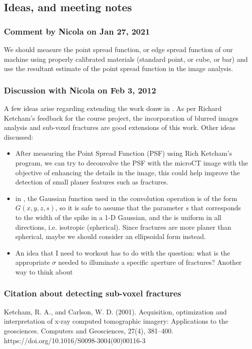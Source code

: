 \documentclass{article}
\begin{document}
\subsection{Ideas, and meeting notes}
\subsubsection{Comment by Nicola on Jan 27, 2021}
We should measure the point spread function, or edge spread function of our machine using properly calibrated materials (standard point, or cube, or bar) and use the resultant estimate of the point spread function in the image analysis. 

\subsubsection{Discussion with Nicola on Feb 3, 2012}
A few ideas arise regarding extending the work donw in \cite{Voorn2013}. As per Richard Ketcham's feedback for the course project, the incorporation of blurred images analysis and sub-voxel fractures are good extensions of this work. Other ideas discussed:
\begin{itemize}
	\item After measuring the Point Spread Function (PSF) using Rich Ketcham's program, we can try to deconvolve the PSF with the microCT image with the objective of enhancing the details in the image, this could help improve the detection of small planer features such as fractures. 
	\item in \cite{Voorn2013}, the Gaussian function used in the convolution operation is of the form $ G(x,y,z,s)$, so it is safe to assume that the parameter $s$ that corresponds to the width of the spike in a 1-D Gaussian, and the  is uniform in all directions, i.e. isotropic (spherical). Since fractures are more planer than spherical, maybe we should consider an ellipsoidal form instead. 
	\item An idea that I need to workout has to do with the question: what is the appropriate $\sigma$  needed to illuminate a specific aperture of fractures? Another way to think about
\end{itemize} 

\subsubsection{Citation about detecting sub-voxel fractures}
Ketcham, R. A., and Carlson, W. D. (2001). Acquisition, optimization and interpretation of x-ray computed tomographic imagery: Applications to the geosciences. Computers and Geosciences, 27(4), 381–400. https://doi.org/10.1016/S0098-3004(00)00116-3
\end{document}
